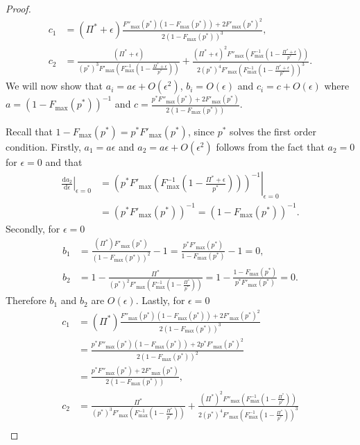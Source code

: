 \documentclass[11pt,a4paper]{article}
\numberwithin{equation}{section}
\begin{document}
\begin{proof}
\begin{align*}
        c_1&=(\Pi^*+\epsilon)\frac{F''_{\max}(p^*)(1-F_{\max}(p^*))+2F'_{\max}(p^*)^2}{2(1-F_{\max}(p^*))^3},\\
        c_2&=\frac{(\Pi^*+\epsilon)}{(p^*)^3F'_{\max}\left(F^{-1}_{\max}\left(1-\frac{\Pi^*+\epsilon}{p^*}\right)\right)}+\frac{(\Pi^*+\epsilon)^2F''_{\max}\left(F^{-1}_{\max}\left(1-\frac{\Pi^*+\epsilon}{p^*}\right)\right)}{2(p^*)^4F'_{\max}\left(F^{-1}_{\max}\left(1-\frac{\Pi^*+\epsilon}{p^*}\right)\right)^3}.
    \end{align*}
    We will now show that $a_i=a\epsilon+O(\epsilon^2)$, $b_i=O(\epsilon)$ and $c_i=c+O(\epsilon)$ where $a=(1-F_{\max}(p^*))^{-1}$ and $c=\frac{p^*F''_{\max}(p^*)+2F'_{\max}(p^*)}{2(1-F_{\max}(p^*))}$. 
    
    Recall that $1-F_{\max}(p^*)=p^*F'_{\max}(p^*)$, since $p^*$ solves the first order condition.
    Firstly, $a_1=a\epsilon$ and $a_2=a\epsilon+O(\epsilon^2)$ follows from the fact that $a_2=0$ for $\epsilon=0$ and that 
    \begin{align*}
        \left. \frac{\mathrm{d} a_2}{\mathrm{d} \epsilon} \right|_{\epsilon = 0}&=
    \left. \left(p^*F'_{\max}\left(F^{-1}_{\max}\left(1-\frac{\Pi^*+\epsilon}{p^*}\right)\right)\right)^{-1} \right|_{\epsilon = 0}\\
    &=(p^*F'_{\max}(p^*))^{-1}=(1-F_{\max}(p^*))^{-1}.
    \end{align*}
    Secondly, for $\epsilon=0$ 
    \begin{align*}    
        b_1&=\frac{(\Pi^*)F'_{\max}(p^*)}{(1-F_{\max}(p^*))^2}-1=\frac{p^*F'_{\max}\left(p^*\right)}{1-F_{\max}(p^*)}-1=0,\\
        b_2&=1-\frac{\Pi^*}{(p^*)^2F'_{\max}\left(F^{-1}_{\max}\left(1-\frac{\Pi^*}{p^*}\right)\right)}=1-\frac{1-F_{\max}(p^*)}{p^*F'_{\max}\left(p^*\right)}=0.
    \end{align*}
    Therefore $b_1$ and $b_2$ are $O(\epsilon)$. Lastly, for $\epsilon=0$ 
    \begin{align*}    
        c_1&=(\Pi^*)\frac{F''_{\max}(p^*)(1-F_{\max}(p^*))+2F'_{\max}(p^*)^2}{2(1-F_{\max}(p^*))^3}\\
        &=\frac{p^*F''_{\max}(p^*)(1-F_{\max}(p^*))+2p^*F'_{\max}(p^*)^2}{2(1-F_{\max}(p^*))^2}\\
        &=\frac{p^*F''_{\max}(p^*)+2F'_{\max}(p^*)}{2(1-F_{\max}(p^*))},\\
        c_2&=\frac{\Pi^*}{(p^*)^3F'_{\max}\left(F^{-1}_{\max}\left(1-\frac{\Pi^*}{p^*}\right)\right)}+\frac{(\Pi^*)^2F''_{\max}\left(F^{-1}_{\max}\left(1-\frac{\Pi^*}{p^*}\right)\right)}{2(p^*)^4F'_{\max}\left(F^{-1}_{\max}\left(1-\frac{\Pi^*}{p^*}\right)\right)^3}\\

\end{align*}
\end{proof}
\end{document}
